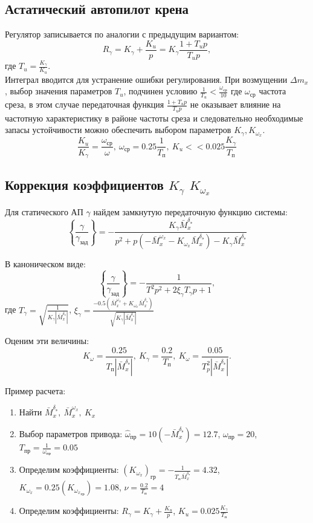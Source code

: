 \documentclass{article}
\begin{document}
\subsection{Астатический автопилот крена}
Регулятор записывается по аналогии с предыдущим вариантом:
\[
    R_\gamma = K_\gamma +\frac{K_u}{p}  = K_\gamma\frac{1 + T_u p}{T_u p},
\]
где $T_u  = \frac{K_\gamma}{K_u}$.\\
Интеграл вводится для устранение ошибки регулирования. При возмущении $\Delta
m_x$, выбор значения параметров $T_u$, подчинен условию $\frac{1}{T_u} <
\frac{\omega_\text{ср}}{10}$ где $\omega_\text{ср}$ частота среза, в этом
случае передаточная функция $\frac{1 + T_u p}{T_u p}$ не оказывает влияние на
частотную характеристику в районе частоты среза и следовательно необходимые
запасы устойчивости можно обеспечить выбором параметров $K_\gamma,
K_{\omega_x}$.
\[
    \frac{K_u}{K_\gamma} =\frac{\omega_\text{ср}}{\omega}, \ \omega_\text{ср} =
    0.25\frac{1}{T_\text{п}}, \ K_u << 0.025\frac{K_\gamma}{T_\text{п}}
\]
\subsection{Коррекция коэффициентов \texorpdfstring{$K_\gamma$}{Lg}
\texorpdfstring{$K_{\omega_x}$}{Lg}}
Для статического АП $\gamma$ найдем замкнутую передаточную функцию системы:
\[
    \left\{\frac{\gamma}{\gamma_\text{зад}}\right\} = -\frac{K_\gamma
    \bar{M}_x^{\delta_\text{э}}}{p^2 + p(-\bar{M}_x^{\omega_x} - K_{\omega_x}
\bar{M}_x^{\delta_\text{э}}) - K_{\gamma} \bar{M}_x^{\delta_\text{э}}}
\]

В каноническом виде:
\[
    \left\{\frac{\gamma}{\gamma_\text{зад}}\right\} = -\frac{1}{T^2 p^2 +
    2\xi_{\gamma} T_{\gamma} p + 1},
\]
где $T_\gamma = \sqrt{\frac{1}{K_\gamma |\bar{M}_x^{\delta_\text{э}}|}}$,
$\xi_{\gamma} = \frac{-0.5(\bar{M}_x^{\omega_x} + K_{\omega_x}
\bar{M}_x^{\delta_\text{э}})}{\sqrt{K_\gamma |\bar{M}_x^{\delta_\text{э}}|}}$

Оценим эти величины:
\[
    K_\omega =\frac{0.25}{T_\text{п}|\bar{M}_x^{\delta_\text{э}}|},\ K_\gamma =
    \frac{0.2}{T_\text{п}},\ K_\omega =\frac{0.05}{T_p^2
    |\bar{M}_x^{\delta_\text{э}}|}.
\]

Пример расчета:
\begin{enumerate}
    \item Найти $\bar{M}_x ^{\delta_\text{э}},\ \bar{M}_x^{\omega_x},\ K_x$
    \item Выбор параметров привода:
          $\hat{\omega}_\text{пр} = 10(-\bar{M}_x^{\delta_\text{э}}) =  12.7$,
          $\omega_\text{пр} = 20$, $T_\text{пр} = \frac{1}{\omega_\text{пр}} =
          0.05$
    \item Определим коэффициенты:
          $(K_{\omega_x})_\text{гр} = -\frac{1}{T_\text{п}
          \bar{M}_x^{\delta_\text{э}}}=4.32$, $K_{\omega_x} = 0.25
          (K_{{\omega_x}_\text{гр}}) = 1.08$, $\nu =\frac{0.2}{T_\text{п}}=4$
    \item Определим коэффициенты: $R_\gamma = K_\gamma +\frac{K_u}{p}$, $K_u =
        0.025 \frac{K_\gamma}{T_\text{п}}$
\end{enumerate}
\end{document}
